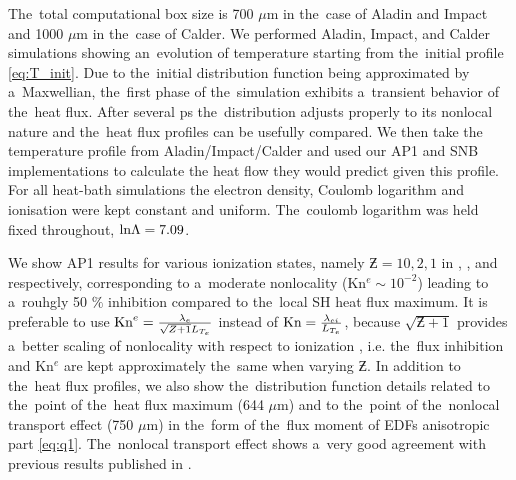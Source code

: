 
The~total computational box size is 700 $\mu$m in the~case
of Aladin and Impact and 1000 $\mu$m in the~case of Calder.
We performed Aladin, Impact, and Calder simulations showing an~evolution of
temperature starting from the~initial profile \eqref{eq:T_init}. 
Due to the~initial distribution function being approximated by a~Maxwellian,
the~first phase of the~simulation exhibits a~transient behavior of the~heat
flux. After several ps the~distribution adjusts properly to its nonlocal nature
and the~heat flux profiles can be usefully compared. 
We then take the temperature profile from Aladin/Impact/Calder and used 
our AP1 and SNB implementations to calculate the heat flow
they would predict given this profile. 
For all heat-bath simulations the electron density, Coulomb logarithm and 
ionisation were kept constant and uniform.
The~coulomb logarithm was held fixed throughout, $\text{ln}\Lambda = 7.09$.

We show AP1 results for various ionization states, namely $\Zbar= 10, 2, 1$ 
in , , 
and  respectively, corresponding to 
a~moderate nonlocality 
(Kn$^e \sim 10^{-2}$) leading to a~rouhgly 50 $\%$ inhibition compared 
to the~local SH heat flux maximum. 
It is preferable to use 
$\text{Kn}^e = \frac{\lambda_e}{\sqrt{Z + 1}L_{T_e}}$ instead of
 $\text{Kn} = \frac{\lambda_{ei}}{L_{T_e}}$, because $\sqrt{\Zbar + 1}$ provides 
a~better scaling of nonlocality with respect
to ionization \cite{LMV_1983_7}, i.e. the~flux inhibition and Kn$^e$ are
kept approximately the~same when varying $\Zbar$.
In addition to the~heat flux profiles, we also show the~distribution function 
details related to the~point of the~heat flux maximum (644 $\mu$m) 
and to the~point of the~nonlocal transport effect (750 $\mu$m) in the~form of
the~flux moment of EDFs anisotropic part \eqref{eq:q1}.
The~nonlocal transport effect shows a~very good agreement with 
previous results published in \cite{Sherlock_PoP2017}.

